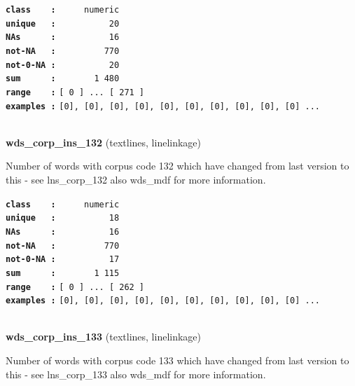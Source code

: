 \documentclass[]{article}
\begin{document}
\textbf{\texttt{class\ \ \ \ :}} \texttt{~~~~~numeric}\\
\textbf{\texttt{unique\ \ \ :}} \texttt{~~~~~~~~~~20}\\
\textbf{\texttt{NAs\ \ \ \ \ \ :}} \texttt{~~~~~~~~~~16}\\
\textbf{\texttt{not-NA\ \ \ :}} \texttt{~~~~~~~~~770}\\
\textbf{\texttt{not-0-NA\ :}} \texttt{~~~~~~~~~~20}\\
\textbf{\texttt{sum\ \ \ \ \ \ :}} \texttt{~~~~~~~1~480}\\
\textbf{\texttt{range\ \ \ \ :}}
\texttt{{[}\ 0\ {]}\ ...\ {[}\ 271\ {]}}\\
\textbf{\texttt{examples\ :}}
\texttt{{[}0{]},\ {[}0{]},\ {[}0{]},\ {[}0{]},\ {[}0{]},\ {[}0{]},\ {[}0{]},\ {[}0{]},\ {[}0{]},\ {[}0{]}\ ...}\\

~

\textbf{wds\_corp\_ins\_132} (textlines, linelinkage)

Number of words with corpus code 132 which have changed from last
version to this - see lns\_corp\_132 also wds\_mdf for more information.

\textbf{\texttt{class\ \ \ \ :}} \texttt{~~~~~numeric}\\
\textbf{\texttt{unique\ \ \ :}} \texttt{~~~~~~~~~~18}\\
\textbf{\texttt{NAs\ \ \ \ \ \ :}} \texttt{~~~~~~~~~~16}\\
\textbf{\texttt{not-NA\ \ \ :}} \texttt{~~~~~~~~~770}\\
\textbf{\texttt{not-0-NA\ :}} \texttt{~~~~~~~~~~17}\\
\textbf{\texttt{sum\ \ \ \ \ \ :}} \texttt{~~~~~~~1~115}\\
\textbf{\texttt{range\ \ \ \ :}}
\texttt{{[}\ 0\ {]}\ ...\ {[}\ 262\ {]}}\\
\textbf{\texttt{examples\ :}}
\texttt{{[}0{]},\ {[}0{]},\ {[}0{]},\ {[}0{]},\ {[}0{]},\ {[}0{]},\ {[}0{]},\ {[}0{]},\ {[}0{]},\ {[}0{]}\ ...}\\

~

\textbf{wds\_corp\_ins\_133} (textlines, linelinkage)

Number of words with corpus code 133 which have changed from last
version to this - see lns\_corp\_133 also wds\_mdf for more information.
\end{document}
